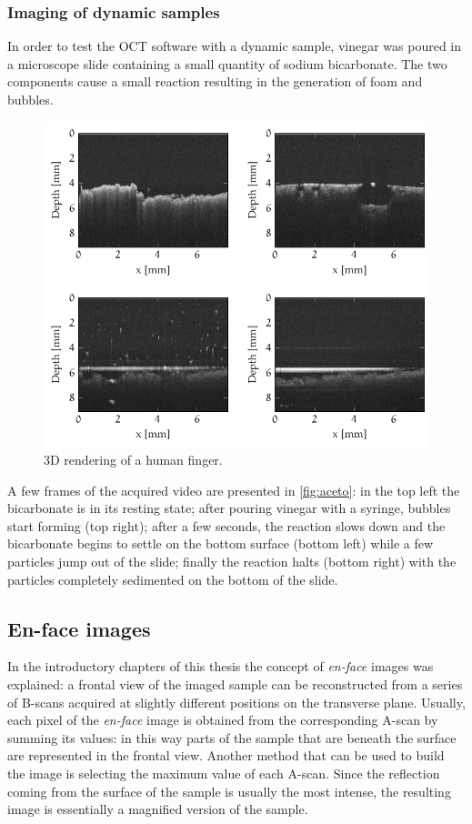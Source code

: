\subsubsection{Imaging of dynamic samples}
In order to test the OCT software with a dynamic sample, vinegar was poured in a microscope slide containing a small quantity of sodium bicarbonate. The two components cause a small reaction resulting in the generation of foam and bubbles. 
\begin{figure}[htb]
	\centering
	\includegraphics[width=\linewidth]{gfx/ch4/santec/aceto}
	\caption[]{3D rendering of a human finger.}\label{fig:aceto}
\end{figure}
A few frames of the acquired video are presented in \autoref{fig:aceto}: in the top left the bicarbonate is in its resting state; after pouring vinegar with a syringe, bubbles start forming (top right); after a few seconds, the reaction slows down and the bicarbonate begins to settle on the bottom surface (bottom left) while a few particles jump out of the slide; finally the reaction halts (bottom right) with the particles completely sedimented on the bottom of the slide. 

\FloatBarrier
\subsection{En-face images}
In the introductory chapters of this thesis the concept of \emph{en-face} images was explained: a frontal view of the imaged sample can be reconstructed from a series of B-scans acquired at slightly different positions on the transverse plane. Usually, each pixel of the \emph{en-face} image is obtained from the corresponding A-scan by summing its values: in this way parts of the sample that are beneath the surface are represented in the frontal view. Another method that can be used to build the image is selecting the maximum value of each A-scan. Since the reflection coming from the surface of the sample is usually the most intense, the resulting image is essentially a magnified version of the sample. 


